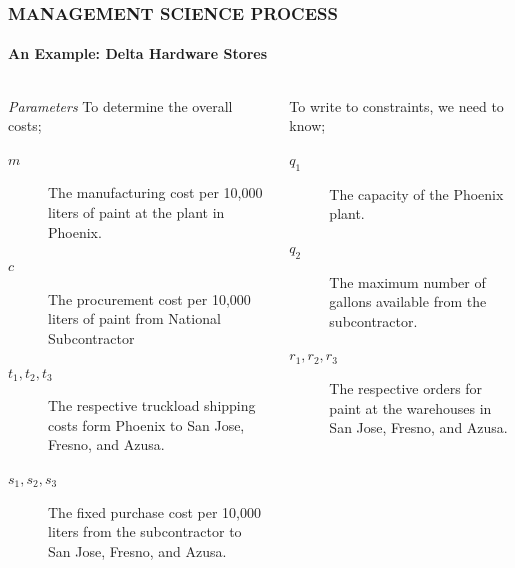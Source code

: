 \documentclass[14 pt]{beamer}
\begin{document}
\begin{frame}[t]
\frametitle{MANAGEMENT SCIENCE PROCESS}
\framesubtitle{An Example: Delta Hardware Stores}

\begin{columns}[t]
\begin{column}{0.45\textwidth}
\emph{Parameters}
\vskip0.5cm%
To determine the overall costs;
\begin{description}
  \item [$m$] The manufacturing cost per 10,000 liters of paint at the plant in Phoenix.
  \item [$c$] The procurement cost per 10,000 liters of paint from National Subcontractor
  \item [$t_1, t_2, t_3$] The respective truckload shipping costs form Phoenix to San Jose, Fresno, and Azusa.
  \item [$s_1, s_2, s_3$] The fixed purchase cost per 10,000 liters from the subcontractor to San Jose, Fresno, and Azusa.
\end{description}
\end{column}

\begin{column}{0.45\textwidth}
\vskip0.5cm%
To write to constraints, we need to know;
\begin{description}
  \item [$q_1$] The capacity of the Phoenix plant.
  \item [$q_2$] The maximum number of gallons available from the subcontractor.
  \item [$r_1, r_2, r_3$] The respective orders for paint at the warehouses in San Jose, Fresno, and Azusa.
\end{description}
\end{column}
\end{columns}
\end{frame}

\end{document}
